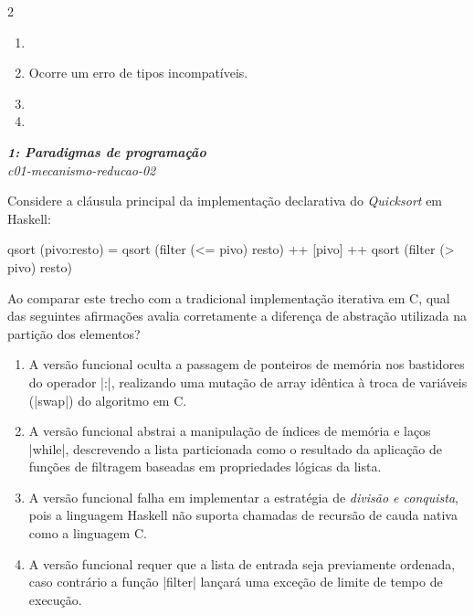 \documentclass[a4paper,10pt,brazil]{article}
\begin{document}
\begin{multicols}{2}
\begin{enumerate}
  \item {}

  \item Ocorre um erro de tipos incompatíveis.

  \item {}

  \item {}


\end{enumerate}

\begin{flushright}
  \footnotesize
  \textit{\textbf{1: Paradigmas de programação}}\\
  \textit{c01-mecanismo-reducao-02}\\

\end{flushright}
Considere a cláusula principal da implementação declarativa do \emph{Quicksort} em Haskell:

\begin{haskellcode}
qsort (pivo:resto) = qsort (filter (<= pivo) resto) ++ 
                     [pivo] ++ 
                     qsort (filter (> pivo) resto)
\end{haskellcode}

Ao comparar este trecho com a tradicional implementação iterativa em C, qual das seguintes afirmações avalia corretamente a diferença de abstração utilizada na partição dos elementos?

\begin{enumerate}
  \item A versão funcional oculta a passagem de ponteiros de memória nos bastidores do operador \haskellinline|:|, realizando uma mutação de array idêntica à troca de variáveis (\cinline|swap|) do algoritmo em C.

  \item A versão funcional abstrai a manipulação de índices de memória e laços \cinline|while|, descrevendo a lista particionada como o resultado da aplicação de funções de filtragem baseadas em propriedades lógicas da lista.

  \item A versão funcional falha em implementar a estratégia de \emph{divisão e conquista}, pois a linguagem Haskell não suporta chamadas de recursão de cauda nativa como a linguagem C.

  \item A versão funcional requer que a lista de entrada seja previamente ordenada, caso contrário a função \haskellinline|filter| lançará uma exceção de limite de tempo de execução.


\end{enumerate}
\end{multicols}
\end{document}
